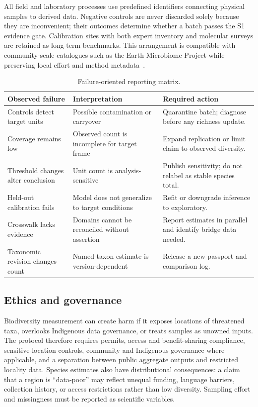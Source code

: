 \documentclass[conference]{IEEEtran}
\begin{document}
All field and laboratory processes use predefined identifiers connecting physical samples to derived data. Negative controls are never discarded solely because they are inconvenient; their outcomes determine whether a batch passes the S1 evidence gate. Calibration sites with both expert inventory and molecular surveys are retained as long-term benchmarks. This arrangement is compatible with community-scale catalogues such as the Earth Microbiome Project while preserving local effort and method metadata~\cite{thompson2017}.

\begin{table}[t]
\caption{Failure-oriented reporting matrix.}
\label{tab:failure}
\centering
\footnotesize
\begin{tabular}{L{0.27\columnwidth} L{0.30\columnwidth} L{0.29\columnwidth}}
\toprule
\textbf{Observed failure} & \textbf{Interpretation} & \textbf{Required action}\\
\midrule
Controls detect target units & Possible contamination or carryover & Quarantine batch; diagnose before any richness update.\\
Coverage remains low & Observed count is incomplete for target frame & Expand replication or limit claim to observed diversity.\\
Threshold changes alter conclusion & Unit count is analysis-sensitive & Publish sensitivity; do not relabel as stable species total.\\
Held-out calibration fails & Model does not generalize to target conditions & Refit or downgrade inference to exploratory.\\
Crosswalk lacks evidence & Domains cannot be reconciled without assertion & Report estimates in parallel and identify bridge data needed.\\
Taxonomic revision changes count & Named-taxon estimate is version-dependent & Release a new passport and comparison log.\\
\bottomrule
\end{tabular}
\end{table}

\subsection{Ethics and governance}

Biodiversity measurement can create harm if it exposes locations of threatened taxa, overlooks Indigenous data governance, or treats samples as unowned inputs. The protocol therefore requires permits, access and benefit-sharing compliance, sensitive-location controls, community and Indigenous governance where applicable, and a separation between public aggregate outputs and restricted locality data. Species estimates also have distributional consequences: a claim that a region is ``data-poor'' may reflect unequal funding, language barriers, collection history, or access restrictions rather than low diversity. Sampling effort and missingness must be reported as scientific variables.
\end{document}
